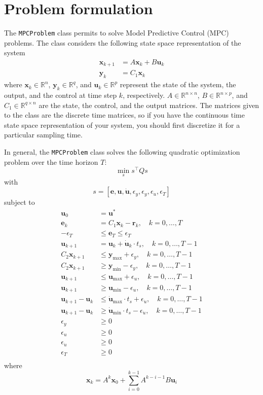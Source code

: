 \documentclass[10pt,a4paper]{article}
\newcommand{\xk}{\ensuremath{\bm{x}_k}\xspace}
\newcommand{\yk}{\ensuremath{\bm{y}_k}\xspace}
\newcommand{\xkk}{\ensuremath{\bm{x}_{k+1}}\xspace}
\newcommand{\xx}[1]{\ensuremath{\bm{x}_{#1}}\xspace}
\newcommand{\uk}{\ensuremath{\bm{u}_k}\xspace}
\newcommand{\ukk}{\ensuremath{\bm{u}_{k+1}}\xspace}
\newcommand{\uu}[1]{\ensuremath{\bm{u}_{#1}}\xspace}
\newcommand{\duk}{\ensuremath{\bm{\dot{u}}_k}\xspace}
\newcommand{\ek}{\ensuremath{\bm{e}_k}\xspace}
\newcommand{\ee}[1]{\ensuremath{\bm{e}_{#1}}\xspace}
\newcommand{\rk}{\ensuremath{\bm{r}_k}\xspace}
\newcommand{\ymin}{\ensuremath{\bm{y}_\text{min}}\xspace}
\newcommand{\ymax}{\ensuremath{\bm{y}_\text{max}}\xspace}
\newcommand{\umin}{\ensuremath{\bm{u}_\text{min}}\xspace}
\newcommand{\umax}{\ensuremath{\bm{u}_\text{max}}\xspace}
\newcommand{\dumin}{\ensuremath{\bm{\dot{u}}_\text{min}}\xspace}
\newcommand{\dumax}{\ensuremath{\bm{\dot{u}}_\text{max}}\xspace}
\newcommand{\epsy}{\ensuremath{\epsilon_{y}}\xspace}
\newcommand{\epsu}{\ensuremath{\epsilon_{u}}\xspace}
\newcommand{\epsdu}{\ensuremath{\epsilon_{\dot{u}}}\xspace}
\newcommand{\epst}{\ensuremath{\epsilon_T}\xspace}
\newcommand{\code}[1]{\texttt{#1}\xspace}
\newcommand{\R}{\ensuremath{\mathbb{R}\xspace}}
\newcommand{\ts}{\ensuremath{t_s}}
\newcommand{\Co}{\ensuremath{C_1}}
\newcommand{\Cc}{\ensuremath{C_2}}
\begin{document}
\section{Problem formulation}

The \code{MPCProblem} class permits to solve Model Predictive Control (MPC) problems.
The class considers the following state space representation of the system
\begin{align}
    \xkk &= A\xk + B\uk\\
    \yk &= \Co\xk
\end{align}
where $\xk \in \R^n$, $\yk \in \R^q$, and $\uk \in \R^p$ represent the state of the system, the output, and the control at time step $k$, respectively.
$A \in \R^{n \times n}$, $B \in \R^{n \times p}$, and $\Co \in \R^{q \times n}$ are the state, the control, and the output matrices.
The matrices given to the class are the discrete time matrices, so if you have the continuous time state space representation of your system, you should first discretize it for a particular sampling time.

In general, the \code{MPCProblem} class solves the following quadratic optimization problem over the time horizon $T$:
\begin{equation}
    \label{eq:min}
    \min_s s^\intercal Q s
\end{equation}
with
\begin{equation}
    \label{eq:s}
    s = [\bm{e}, \bm{u}, \bm{\dot{u}}, \epsy, \epsy, \epsdu, \epst]
\end{equation}
subject to
\begin{align}
    \uu{0} &= \bm{u}^* \label{eq:u0}\\
    \ek &= \Co\xk - \rk,\quad k = 0,\dots,T \label{eq:error}\\
    -\epst &\leq \ee{T} \leq \epst \label{eq:terminal}\\
    \ukk &= \uk + \duk \cdot \ts,\quad k = 0,\dots,T-1 \label{eq:duk}\\
    \Cc\xkk &\leq \ymax + \epsy,\quad k = 0,\dots,T-1 \label{eq:ymax}\\
    \Cc\xkk &\geq \ymin - \epsy,\quad k = 0,\dots,T-1 \label{eq:ymin}\\
    \ukk &\leq \umax + \epsu,\quad k = 0,\dots,T-1 \label{eq:umax}\\
    \ukk &\geq \umin - \epsu,\quad k = 0,\dots,T-1 \label{eq:umin}\\
    \ukk - \uk &\leq \dumax\cdot\ts + \epsdu,\quad k = 0,\dots,T-1 \label{eq:dumax}\\
    \ukk - \uk &\geq \dumin\cdot\ts - \epsdu,\quad k = 0,\dots,T-1 \label{eq:dumin}\\
    \epsy &\geq 0 \label{eq:epsy}\\
    \epsu &\geq 0 \label{eq:epsu}\\
    \epsdu &\geq 0 \label{eq:epsdu}\\
    \epst &\geq 0 \label{eq:epst}\\
\end{align}
where
\begin{equation}
    \label{eq:xk}
    \xk = A^{k} \xx{0} + \sum_{i=0}^{k-1} A^{k-i-1}B \uu{i}
\end{equation}
\end{document}
